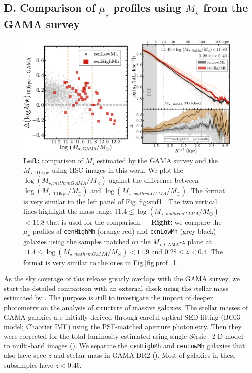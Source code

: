 \documentclass{emulateapj}
\def\ser{{S\'{e}rsic\ }}
\def\rbcg{\texttt{cenHighMh}}
\def\nbcg{\texttt{cenLowMh}}
\def\mstar{{$M_{\star}$}}
\def\mtot{{$M_{\star,100\mathrm{kpc}}$}}
\def\mgama{{$M_{\star,\mathrm{GAMA}}$}}
\def\logmtot{{$\log (M_{\star,100\mathrm{kpc}}/M_{\odot})$}}
\def\logmgama{{$\log (M_{\star,mathrm{GAMA}}/M_{\odot})$}}
\def\mden{{$\mu_{\star}$}}
\newcommand{\update}[1]{\textcolor{Bittersweet}{#1}}
\begin{document}
\begin{CJK*}{UTF8}{gbsn}

\section{D. Comparison of \mden{} profiles using \mstar{} from the GAMA survey}
    \label{app:C}

\begin{figure}[bt!]
    \centering 
    \includegraphics[width=\textwidth]{fig/redbcg_prof_gama_new}
    \caption{
        \update{
        \textbf{Left:} comparison of \mstar{} estimated by the GAMA survey and 
        the \mtot{} using HSC images in this work. 
        We plot the \logmgama{} against the difference between \logmtot{} and \logmgama{}. 
        The format is very similar to the left panel of Fig.\ref{fig:smf1}. 
        The two vertical lines highlight the mass range $11.4 \leq$\logmgama{}$<11.8$ 
        that is used for the comparison.~~
        \textbf{Right:} we compare the \mden{} profiles of \rbcg{} (orange-red) and 
        \nbcg{} (grey-black) galaxies using the samples matched on the 
        \mgama{}-$z$ plane at $11.4 \leq$\logmgama{}$<11.9$ and $0.28 \leq z < 0.4$. 
        The format is very similar to the ones in Fig.\ref{fig:prof_1}.}
        }
    \label{fig:gama}
\end{figure}

    As the sky coverage of this release greatly overlaps with the GAMA survey,
    we start the detailed comparison with an external check using the stellar
    mass estimated by \citep{Taylor2011}. 
    The purpose is still to investigate the impact of deeper photometry on 
    the analysis of structure of massive galaxies.  
    The stellar masses of GAMA galaxies are initially derived through careful 
    optical-SED fitting (BC03 model; Chabrier IMF) using the PSF-matched 
    aperture photometry.  
    Then they were corrected for the total luminosity estimated using single-\ser{}
    2-D model to multi-band images (\citealt{Kelvin2012}).  
    We separate the \rbcg{} and \nbcg{} galaxies that also have 
    spec-$z$ and stellar mass in GAMA DR2 (\citealt{Liske2015}).
    Most of galaxies in these subsamples have $z < 0.40$. 
    

\end{CJK*}
\end{document}
